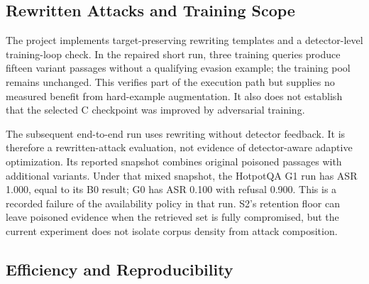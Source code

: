 \documentclass[sigconf]{acmart}
\newif\ifrevisionnotes
\newcommand{\verification}[1]{%
  \ifrevisionnotes
    \par\smallskip\noindent
    {\small\color{red!65!black}\textbf{Verification pending.} #1}\par\smallskip
  \fi}
\begin{document}
\verification{The latest report excludes 28 all-evidence coalitions because their remaining context is empty. This is not a mathematical reason to exclude them. Complete query-only generator probes for these coalitions, verify the fixed analysis list and reuse conditions, and report full-set and remaining-context-stratified correlations. The current 35-coalition subset must not be presented as the complete validation of the proxy.}

\subsection{Rewritten Attacks and Training Scope}

The project implements target-preserving rewriting templates and a detector-level training-loop check. In the repaired short run, three training queries produce fifteen variant passages without a qualifying evasion example; the training pool remains unchanged. This verifies part of the execution path but supplies no measured benefit from hard-example augmentation. It also does not establish that the selected C checkpoint was improved by adversarial training.

The subsequent end-to-end run uses rewriting without detector feedback. It is therefore a rewritten-attack evaluation, not evidence of detector-aware adaptive optimization. Its reported snapshot combines original poisoned passages with additional variants. Under that mixed snapshot, the HotpotQA G1 run has ASR 1.000, equal to its B0 result; G0 has ASR 0.100 with refusal 0.900. This is a recorded failure of the availability policy in that run. S2's retention floor can leave poisoned evidence when the retrieved set is fully compromised, but the current experiment does not isolate corpus density from attack composition.

\verification{Do not use the mixed-snapshot run as the final per-family attack table. Verify whether a/b/c shared one index, whether repeated queries therefore used identical contexts, and whether the 450 variants were counted per dataset or across all datasets. Replace each evaluated query's original five attack passages with five passages from one family at a time, keeping the budget fixed. Reconcile escape inequalities with raw risk scores, thresholds, retained poison, and answer outcomes. Do not call this detector-aware adaptive robustness unless feedback-based optimization is actually evaluated.}

\subsection{Efficiency and Reproducibility}
\end{document}
